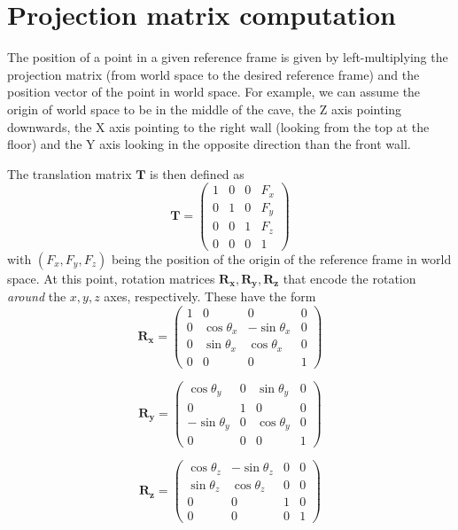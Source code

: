 \documentclass[a4paper]{article}
\begin{document}
\section{Projection matrix
computation}

The position of a point in a given reference frame is given by
left-multiplying the projection matrix (from world space to the desired
reference frame) and the position vector of the point in world space.
For example, we can assume the origin of world space to be in the middle
of the cave, the Z axis pointing downwards, the X axis pointing to the
right wall (looking from the top at the floor) and the Y axis looking in
the opposite direction than the front wall.

The translation matrix \(\mathbf{T}\) is then defined as \[
\mathbf{T} = \begin{pmatrix}
1 & 0 & 0 & F_x \\
0 & 1 & 0 & F_y \\
0 & 0 & 1 & F_z \\
0 & 0 & 0 & 1
\end{pmatrix}
\] with \((F_x, F_y, F_z)\) being the position of the origin of the
reference frame in world space. At this point, rotation matrices
\(\mathbf{R_x}, \mathbf{R_y}, \mathbf{R_z}\) that encode the rotation
\emph{around} the \(x, y, z\) axes, respectively. These have the form \[
\mathbf{R_x} = \begin{pmatrix}
1 & 0 & 0 & 0 \\
0 & \cos \theta_x & -\sin \theta_x & 0 \\
0 & \sin \theta_x & \cos \theta_x & 0 \\
0 & 0 & 0 & 1
\end{pmatrix}
\]

\[
\mathbf{R_y} = \begin{pmatrix}
\cos \theta_y & 0 & \sin \theta_y & 0 \\
0 & 1 & 0 & 0 \\
-\sin \theta_y & 0 & \cos \theta_y & 0 \\
0 & 0 & 0 & 1
\end{pmatrix}
\]

\[
\mathbf{R_z} = \begin{pmatrix}
\cos \theta_z & -\sin \theta_z & 0 & 0 \\
\sin\theta_z & \cos \theta_z & 0 & 0 \\
0 & 0 & 1 & 0 \\
0 & 0 & 0 & 1
\end{pmatrix}
\]
\end{document}
